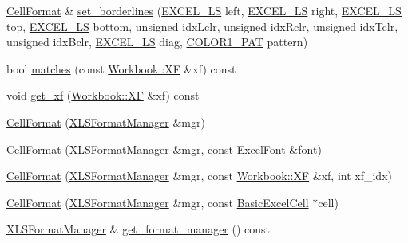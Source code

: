 \begin{DoxyCompactItemize}
\hyperlink{struct_excel_format_1_1_cell_format}{Cell\+Format} \& \hyperlink{struct_excel_format_1_1_cell_format_a1668bb80540887b923b2aa620fa9067e}{set\+\_\+borderlines} (\hyperlink{namespace_excel_format_af723db0cf2ef2243e273dcf782c51355}{E\+X\+C\+E\+L\+\_\+\+L\+S} left, \hyperlink{namespace_excel_format_af723db0cf2ef2243e273dcf782c51355}{E\+X\+C\+E\+L\+\_\+\+L\+S} right, \hyperlink{namespace_excel_format_af723db0cf2ef2243e273dcf782c51355}{E\+X\+C\+E\+L\+\_\+\+L\+S} top, \hyperlink{namespace_excel_format_af723db0cf2ef2243e273dcf782c51355}{E\+X\+C\+E\+L\+\_\+\+L\+S} bottom, unsigned idx\+Lclr, unsigned idx\+Rclr, unsigned idx\+Tclr, unsigned idx\+Bclr, \hyperlink{namespace_excel_format_af723db0cf2ef2243e273dcf782c51355}{E\+X\+C\+E\+L\+\_\+\+L\+S} diag, \hyperlink{namespace_excel_format_ac32635705247b08ca94547c6d08b9f2f}{C\+O\+L\+O\+R1\+\_\+\+P\+A\+T} pattern)
\item 
bool \hyperlink{struct_excel_format_1_1_cell_format_a89917ae10c082ab984acc51d172620ab}{matches} (const \hyperlink{struct_y_excel_1_1_workbook_1_1_x_f}{Workbook\+::\+X\+F} \&xf) const 
\item 
void \hyperlink{struct_excel_format_1_1_cell_format_ab74018c3f4ff008ad530da7c674d1962}{get\+\_\+xf} (\hyperlink{struct_y_excel_1_1_workbook_1_1_x_f}{Workbook\+::\+X\+F} \&xf) const 
\item 
\hyperlink{struct_excel_format_1_1_cell_format_a78f64bc1a0b7b6f7406e972d3a715bd4}{Cell\+Format} (\hyperlink{struct_excel_format_1_1_x_l_s_format_manager}{X\+L\+S\+Format\+Manager} \&mgr)
\item 
\hyperlink{struct_excel_format_1_1_cell_format_a463a56510f06cd9b73f2bb177f6a15de}{Cell\+Format} (\hyperlink{struct_excel_format_1_1_x_l_s_format_manager}{X\+L\+S\+Format\+Manager} \&mgr, const \hyperlink{struct_excel_format_1_1_excel_font}{Excel\+Font} \&font)
\item 
\hyperlink{struct_excel_format_1_1_cell_format_a1848c9d951e12897bc352a09b8bad804}{Cell\+Format} (\hyperlink{struct_excel_format_1_1_x_l_s_format_manager}{X\+L\+S\+Format\+Manager} \&mgr, const \hyperlink{struct_y_excel_1_1_workbook_1_1_x_f}{Workbook\+::\+X\+F} \&xf, int xf\+\_\+idx)
\item 
\hyperlink{struct_excel_format_1_1_cell_format_adfec20abe07d6a70571bad63d50d46da}{Cell\+Format} (\hyperlink{struct_excel_format_1_1_x_l_s_format_manager}{X\+L\+S\+Format\+Manager} \&mgr, const \hyperlink{class_y_excel_1_1_basic_excel_cell}{Basic\+Excel\+Cell} $\ast$cell)
\item 
\hyperlink{struct_excel_format_1_1_x_l_s_format_manager}{X\+L\+S\+Format\+Manager} \& \hyperlink{struct_excel_format_1_1_cell_format_a03a2431b7624a62dcbeabed790b046c3}{get\+\_\+format\+\_\+manager} () const 

\end{DoxyCompactItemize}
